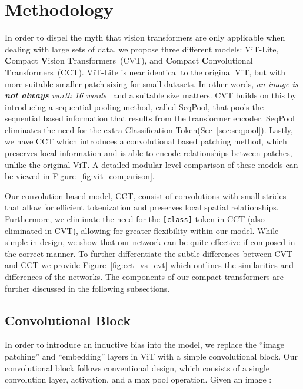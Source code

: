 \documentclass[10pt,twocolumn,letterpaper]{article}
\begin{document}
\section{Methodology}

In order to dispel the myth that vision transformers are only applicable when dealing with large sets of data, we propose three different models: ViT-Lite, \textbf{C}ompact \textbf{V}ision \textbf{T}ransformers~(CVT), and \textbf{C}ompact \textbf{C}onvolutional \textbf{T}ransformers~(CCT). 
ViT-Lite is near identical to the original ViT, but with more suitable smaller patch sizing for small datasets. In other words, \textit{an image is \textbf{not always} worth 16 words}~\cite{dosovitskiy2020image} and a suitable size matters.
CVT builds on this by introducing a sequential pooling method, called SeqPool, that pools the sequential based information that results from the transformer encoder. SeqPool eliminates the need for the extra Classification Token(Sec~\ref{sec:seqpool}).
Lastly, we have CCT which introduces a convolutional based patching method, which preserves local information and is able to encode relationships between patches, unlike the original ViT. A detailed modular-level comparison of these models can be viewed in Figure~\ref{fig:vit_comparison}.

Our convolution based model, CCT, consist of convolutions with small strides that allow for efficient tokenization and preserves local spatial relationships.
Furthermore, we eliminate the need for the \verb|[class]| token in CCT (also eliminated in CVT), allowing for greater flexibility within our model.
While simple in design, we show that our network can be quite effective if composed in the correct manner. 
To further differentiate the subtle differences between CVT and CCT we provide Figure~\ref{fig:cct_vs_cvt} which outlines the similarities and differences of the networks. 
The components of our compact transformers are further discussed in the following subsections. 

\subsection{Convolutional Block}
In order to introduce an inductive bias into the model, we replace the ``image patching'' and ``embedding'' layers in ViT with a simple convolutional block.
Our convolutional block follows conventional design, which consists of a single convolution layer,  activation, and a max pool operation. Given an image :
\end{document}
